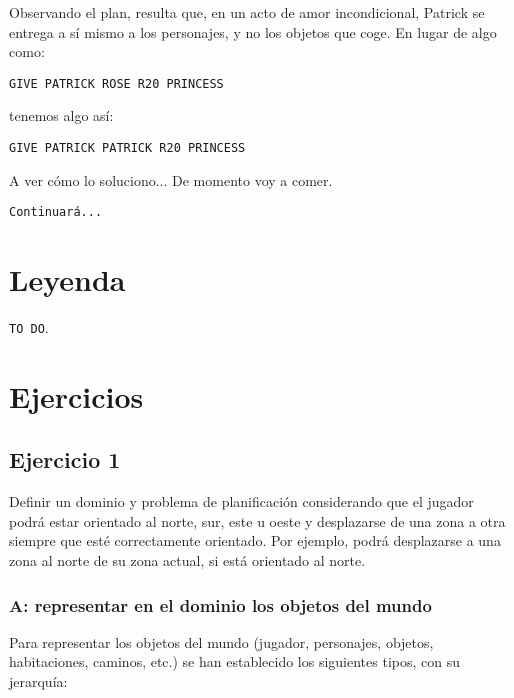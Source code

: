 \documentclass[11pt,a4paper]{article}
\begin{document}
\medskip

Observando el plan, resulta que, en un acto de amor incondicional, Patrick se entrega a sí mismo a los personajes, y no los
objetos que coge. En lugar de algo como:

\medskip
\begin{center}
\texttt{GIVE PATRICK ROSE R20 PRINCESS}
\end{center}

\medskip

tenemos algo así:

\medskip
\begin{center}
\texttt{GIVE PATRICK PATRICK R20 PRINCESS}
\end{center}

\medskip

A ver cómo lo soluciono... De momento voy a comer.

\medskip

\texttt{Continuará...}

\section{Leyenda}

\texttt{TO DO}.

\section{Ejercicios}

\subsection{Ejercicio 1}

Definir  un  dominio y  problema de  planificación considerando  que  el  jugador podrá    estar  orientado  al  norte,  sur,  este  u  oeste  y  desplazarse  de  una  zona  a  otra siempre  que  esté  correctamente  orientado.  Por  ejemplo,  podrá  desplazarse  a  una zona  al  norte  de  su  zona  actual,  si  está  orientado  al  norte.

\subsubsection*{A: representar en el dominio los objetos del mundo}

Para representar los objetos del mundo (jugador, personajes, objetos, habitaciones, caminos, etc.) se han establecido
los siguientes tipos, con su jerarquía:

\medskip
\end{document}
